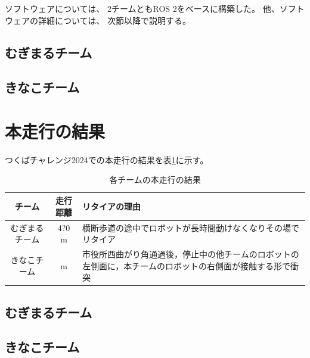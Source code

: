 \documentclass[twocolumn,9pt]{jsproceedings}
\begin{document}
ソフトウェアについては、
2チームともROS 2をベースに構築した。
他、ソフトウェアの詳細については、
次節以降で説明する。


\subsection{むぎまるチーム}


\subsection{きなこチーム}\label{sub:localization}




\section{本走行の結果}

つくばチャレンジ2024での本走行の結果を表\ref{MainRun}に示す。

\begin{table}[H]
  \caption{各チームの本走行の結果}
  \label{MainRun}
  \begin{tabular}{|c|c|p{4.0cm}|}
    \hline
    チーム         & 走行距離 & リタイアの理由                                                                                             \\
    \hline
    むぎまるチーム & 4?0 m    & 横断歩道の途中でロボットが長時間動けなくなりその場でリタイア\\
    \hline
    きなこチーム　 & m    & 市役所西曲がり角通過後，停止中の他チームのロボットの左側面に，本チームのロボットの右側面が接触する形で衝突 \\
    \hline
  \end{tabular}
\end{table}



\subsection{むぎまるチーム}


\subsection{きなこチーム}

\end{document}
